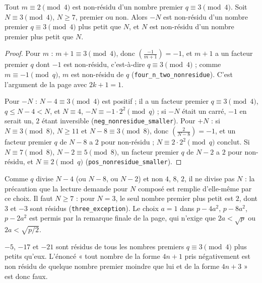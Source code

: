 \begin{enonce}
Tout $m \equiv 2 \pmod 4$ est non-résidu d'un nombre premier $q \equiv 3 \pmod 4$. Soit $N \equiv 3 \pmod 4$, $N \geq 7$, premier ou non. Alors $-N$ est non-résidu d'un nombre premier $q \equiv 3 \pmod 4$ plus petit que $N$, et $N$ est non-résidu d'un nombre premier plus petit que $N$.
\end{enonce}

\begin{proof}
Pour $m$ : $m+1 \equiv 3 \pmod 4$, donc $\left(\frac{-1}{m+1}\right) = -1$, et $m+1$ a un facteur premier $q$ dont $-1$ est non-résidu, c'est-à-dire $q \equiv 3 \pmod 4$ ; comme $m \equiv -1 \pmod q$, $m$ est non-résidu de $q$ (\texttt{four\_n\_two\_nonresidue}). C'est l'argument de la page avec $2k+1 = 1$.

Pour $-N$ : $N - 4 \equiv 3 \pmod 4$ est positif ; il a un facteur premier $q \equiv 3 \pmod 4$, $q \leq N - 4 < N$, et $N \equiv 4$, $-N \equiv -1\cdot 2^2 \pmod q$ ; si $-N$ était un carré, $-1$ en serait un, $2$ étant inversible (\texttt{neg\_nonresidue\_smaller}). Pour $+N$ : si $N \equiv 3 \pmod 8$, $N \geq 11$ et $N - 8 \equiv 3 \pmod 8$, donc $\left(\frac{2}{N-8}\right) = -1$, et un facteur premier $q$ de $N - 8$ a $2$ pour non-résidu ; $N \equiv 2 \cdot 2^2 \pmod q$ conclut. Si $N \equiv 7 \pmod 8$, $N - 2 \equiv 5 \pmod 8$, un facteur premier $q$ de $N-2$ a $2$ pour non-résidu, et $N \equiv 2 \pmod q$ (\texttt{pos\_nonresidue\_smaller}).
\end{proof}

\begin{remarque}
Comme $q$ divise $N - 4$ (ou $N - 8$, ou $N - 2$) et non $4$, $8$, $2$, il ne divise pas $N$ : la précaution que la lecture demande pour $N$ composé est remplie d'elle-même par ce choix. Il faut $N \geq 7$ : pour $N = 3$, le seul nombre premier plus petit est $2$, dont $3$ et $-3$ sont résidus (\texttt{three\_exception}). Le choix $a = 1$ dans $p - 4a^2$, $p - 8a^2$, $p - 2a^2$ est permis par la remarque finale de la page, qui n'exige que $2a < \sqrt p$ ou $2a < \sqrt{p/2}$.
\end{remarque}

\begin{contrexemple}
$-5$, $-17$ et $-21$ sont résidus de tous les nombres premiers $q \equiv 3 \pmod 4$ plus petits qu'eux. L'énoncé « tout nombre de la forme $4n+1$ pris négativement est non résidu de quelque nombre premier moindre que lui et de la forme $4n+3$ » est donc faux.
\end{contrexemple}

